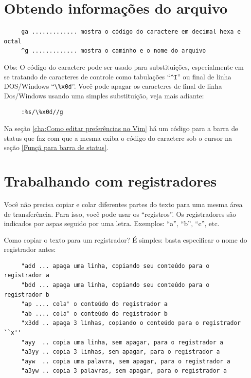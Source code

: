 \documentclass[10pt,a4paper,openany]{book}
\begin{document}
\section{Obtendo informações do arquivo }

\begin{verbatim}
     ga ............. mostra o código do caractere em decimal hexa e octal
     ^g ............. mostra o caminho e o nome do arquivo
\end{verbatim}

Obs: O código do caractere pode ser usado para substituições,
especialmente em se tratando de caracteres de controle como tabulações
``\verb|^I|'' ou final de linha DOS/Windows ``\verb|\%x0d|''. Você pode apagar os
caracteres de final de linha Dos/Windows usando uma simples
substituição, veja mais adiante:

\begin{verbatim}
     :%s/\%x0d//g
\end{verbatim}

Na seção \ref{cha:Como editar preferências no Vim} há um código para a barra de
status que faz com que a mesma exiba o código do caractere sob o cursor na
seção \ref{Funçã para barra de status}.

\section{Trabalhando com registradores}
\label{Trabalhando com registradores}

Você não precisa copiar e colar diferentes partes do texto para uma
mesma área de transferência.  Para isso, você pode usar os
``registros''.  Os registradores são indicados por aspas seguido por uma letra.
Exemplos: ``a'', ``b'', ``c'', etc.

Como copiar o texto para um registrador? É simples: basta especificar
o nome do registrador antes:

\begin{verbatim}
     "add ... apaga uma linha, copiando seu conteúdo para o registrador a
     "bdd ... apaga uma linha, copiando seu conteúdo para o registrador b
     "ap .... cola" o conteúdo do registrador a
     "ab .... cola" o conteúdo do registrador b
     "x3dd .. apaga 3 linhas, copiando o conteúdo para o registrador ``x''
     "ayy  .. copia uma linha, sem apagar, para o registrador a
     "a3yy .. copia 3 linhas, sem apagar, para o registrador a
     "ayw  .. copia uma palavra, sem apagar, para o registrador a
     "a3yw .. copia 3 palavras, sem apagar, para o registrador a
\end{verbatim}
\end{document}
